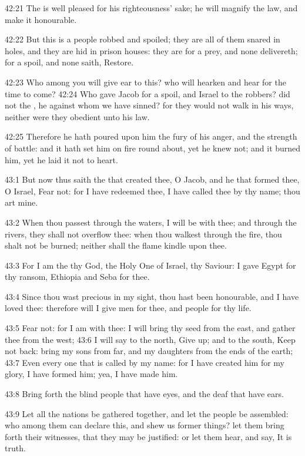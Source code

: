 42:21 The \LORD is well pleased for his righteousness' sake; he will
magnify the law, and make it honourable.

42:22 But this is a people robbed and spoiled; they are all of them
snared in holes, and they are hid in prison houses: they are for a
prey, and none delivereth; for a spoil, and none saith, Restore.

42:23 Who among you will give ear to this? who will hearken and hear
for the time to come?  42:24 Who gave Jacob for a spoil, and Israel to
the robbers? did not the \LORD, he against whom we have sinned? for
they would not walk in his ways, neither were they obedient unto his
law.

42:25 Therefore he hath poured upon him the fury of his anger, and the
strength of battle: and it hath set him on fire round about, yet he
knew not; and it burned him, yet he laid it not to heart.

43:1 But now thus saith the \LORD that created thee, O Jacob, and he
that formed thee, O Israel, Fear not: for I have redeemed thee, I have
called thee by thy name; thou art mine.

43:2 When thou passest through the waters, I will be with thee; and
through the rivers, they shall not overflow thee: when thou walkest
through the fire, thou shalt not be burned; neither shall the flame
kindle upon thee.

43:3 For I am the \LORD thy God, the Holy One of Israel, thy Saviour: I
gave Egypt for thy ransom, Ethiopia and Seba for thee.

43:4 Since thou wast precious in my sight, thou hast been honourable,
and I have loved thee: therefore will I give men for thee, and people
for thy life.

43:5 Fear not: for I am with thee: I will bring thy seed from the
east, and gather thee from the west; 43:6 I will say to the north,
Give up; and to the south, Keep not back: bring my sons from far, and
my daughters from the ends of the earth; 43:7 Even every one that is
called by my name: for I have created him for my glory, I have formed
him; yea, I have made him.

43:8 Bring forth the blind people that have eyes, and the deaf that
have ears.

43:9 Let all the nations be gathered together, and let the people be
assembled: who among them can declare this, and shew us former things?
let them bring forth their witnesses, that they may be justified: or
let them hear, and say, It is truth.

